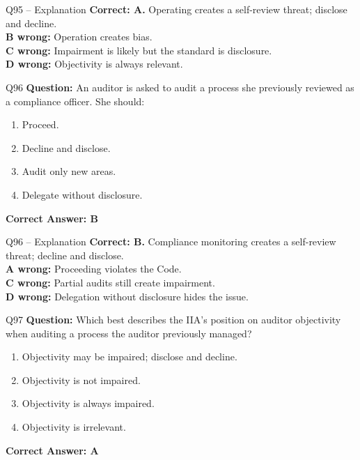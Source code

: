 \documentclass[aspectratio=169,10pt]{beamer}
\begin{document}
	\begin{frame}[t]{Q95 -- Explanation}
		\small
		\textbf{Correct: A.} Operating creates a self-review threat; disclose and decline. \\[4pt]
		\textbf{B wrong:} Operation creates bias. \\[2pt]
		\textbf{C wrong:} Impairment is likely but the standard is disclosure. \\[2pt]
		\textbf{D wrong:} Objectivity is always relevant.
	\end{frame}
	
	\begin{frame}[t]{Q96}
		\small
		\textbf{Question:} An auditor is asked to audit a process she previously reviewed as a compliance officer. She should:
		\begin{enumerate}[label=\Alph*.,itemsep=1pt,topsep=2pt]
			\item Proceed.
			\item Decline and disclose.
			\item Audit only new areas.
			\item Delegate without disclosure.
		\end{enumerate}
		\vspace{4pt}
		\textbf{Correct Answer: B}
	\end{frame}
	
	\begin{frame}[t]{Q96 -- Explanation}
		\small
		\textbf{Correct: B.} Compliance monitoring creates a self-review threat; decline and disclose. \\[4pt]
		\textbf{A wrong:} Proceeding violates the Code. \\[2pt]
		\textbf{C wrong:} Partial audits still create impairment. \\[2pt]
		\textbf{D wrong:} Delegation without disclosure hides the issue.
	\end{frame}
	
	\begin{frame}[t]{Q97}
		\small
		\textbf{Question:} Which best describes the IIA's position on auditor objectivity when auditing a process the auditor previously managed?
		\begin{enumerate}[label=\Alph*.,itemsep=1pt,topsep=2pt]
			\item Objectivity may be impaired; disclose and decline.
			\item Objectivity is not impaired.
			\item Objectivity is always impaired.
			\item Objectivity is irrelevant.
		\end{enumerate}
		\vspace{4pt}
		\textbf{Correct Answer: A}
	\end{frame}
	
\end{document}

